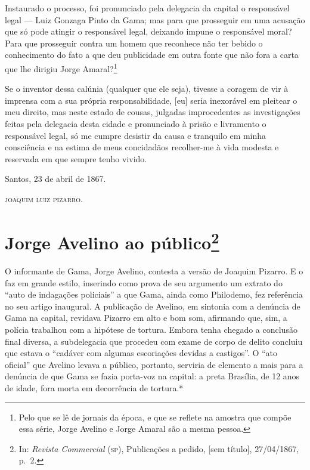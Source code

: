 Instaurado o processo, foi pronunciado pela delegacia da capital o
responsável legal --- Luiz Gonzaga Pinto da Gama; mas para que
prosseguir em uma acusação que só pode atingir o responsável legal,
deixando impune o responsável moral? Para que prosseguir contra um homem
que reconhece não ter bebido o conhecimento do fato a que deu
publicidade em outra fonte que não fora a carta que lhe dirigiu Jorge
Amaral?\footnote{ Pelo que se lê de jornais da época, e que se
  reflete na amostra que compõe essa série, Jorge Avelino e Jorge Amaral
  são a mesma pessoa.}

Se o inventor dessa calúnia (qualquer que ele seja), tivesse a coragem
de vir à imprensa com a sua própria responsabilidade, {[}eu{]} seria
inexorável em pleitear o meu direito, mas neste estado de cousas,
julgadas improcedentes as investigações feitas pela delegacia desta
cidade e pronunciado à prisão e livramento o responsável legal, só me
cumpre desistir da causa e tranquilo em minha consciência e na estima de
meus concidadãos recolher-me à vida modesta e reservada em que sempre
tenho vivido.
\begin{flushright}
Santos, 23 de abril de 1867.

\textsc{joaquim luiz pizarro}.
\end{flushright}
\chapter{Jorge Avelino ao público\footnote{In: 
\emph{Revista Commercial} (\textsc{sp}), Publicações a pedido, {[}sem título{]}, 
27/04/1867, p.~2.}}

\begin{didascalia}
O informante de Gama, Jorge Avelino, contesta a versão de Joaquim
Pizarro. E o faz em grande estilo, inserindo como prova de seu argumento
um extrato do ``auto de indagações policiais'' a que Gama, ainda como
Philodemo, fez referência no seu artigo inaugural. A publicação de
Avelino, em sintonia com a denúncia de Gama na capital, revidava Pizarro
em alto e bom som, afirmando que, sim, a polícia trabalhou com a
hipótese de tortura. Embora tenha chegado a conclusão final diversa, a
subdelegacia que procedeu com exame de corpo de delito concluiu que
estava o ``cadáver com algumas escoriações devidas a castigos''. O ``ato
oficial'' que Avelino levava a público, portanto, serviria de elemento a
mais para a denúncia de que Gama se fazia porta-voz na capital: a preta
Brasília, de 12 anos de idade, fora morta em decorrência de tortura.*
\end{didascalia}

